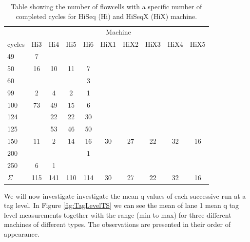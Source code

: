 \documentclass[a4paper,11pt,fleqn,twoside,notitlepage]{report}
\begin{document}
\begin{table}[!htb]
\centering
\caption{Table showing the number of flowcells with a specific number of completed cycles for HiSeq (Hi) and HiSeqX (HiX) machine.} 
\begin{tabular}{lccccccccc}
  \toprule 
  & \multicolumn{9}{c}{Machine} \\ \cmidrule(r){2-10} 
cycles & Hi3 & Hi4 & Hi5 & Hi6 & HiX1 & HiX2 & HiX3 & HiX4 & HiX5 \\ 
  \midrule
49 & 7 &  &  &  &  &  &  &  &  \\ 
  50 & 16 & 10 & 11 & 7 &  &  &  &  &  \\ 
  60 &  &  &  & 3 &  &  &  &  &  \\ 
  99 & 2 & 4 & 2 & 1 &  &  &  &  &  \\ 
  100 & 73 & 49 & 15 & 6 &  &  &  &  &  \\ 
  124 &  & 22 & 22 & 30 &  &  &  &  &  \\ 
  125 &  & 53 & 46 & 50 &  &  &  &  &  \\ 
  150 & 11 & 2 & 14 & 16 & 30 & 27 & 22 & 32 & 16 \\ 
  200 &  &  &  & 1 &  &  &  &  &  \\ 
  250 & 6 & 1 &  &  &  &  &  &  &  \\ 
  \midrule
  $\Sigma$ & 115 & 141 & 110 & 114 & 30 & 27 & 22 & 32 & 16 \\ 
   \bottomrule
\end{tabular}
\label{CompCycl}
\end{table}

We will now investigate investigate the mean q values of each successive run at a tag level. In Figure \ref{fig:TagLevelTS} we can see the mean of lane 1 mean q tag level measurements together with the range (min to max) for three different machines of different types. The observations are presented in their order of appearance.
\end{document}

